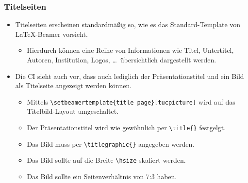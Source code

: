 \begin{frame}[containsverbatim]
\frametitle{Titelseiten}

\begin{itemize}
\item Titelseiten erscheinen standardmäßig so, wie es das Standard-Template
      von \LaTeX-Beamer vorsieht.
  \begin{itemize}
  \item Hierdurch können eine Reihe von Informationen wie Titel, Untertitel,
        Autoren, Institution, Logos, \dots\ übersichtlich dargestellt werden.
  \end{itemize}

\bigskip

\item Die CI sieht auch vor, dass auch lediglich der Präsentationstitel und ein
      Bild als Titelseite angezeigt werden können.
  \begin{itemize}
  \item Mittels \lstinline[language={[LaTeX]TeX}]+\setbeamertemplate{title page}[tucpicture]+
        wird auf das Titelbild-Layout umgeschaltet.
  \item Der Präsentationstitel wird wie gewöhnlich per 
        \lstinline[language={[LaTeX]TeX}]+\title{}+ festgelgt.
  \item Das Bild muss per \lstinline[language={[LaTeX]TeX}]+\titlegraphic{}+
        angegeben werden.
  \item Das Bild sollte auf die Breite \lstinline[language={[LaTeX]TeX}]+\hsize+
        skaliert werden.
  \item Das Bild sollte ein Seitenverhältnis von 7:3 haben.
  \end{itemize}
\end{itemize}
\end{frame}


